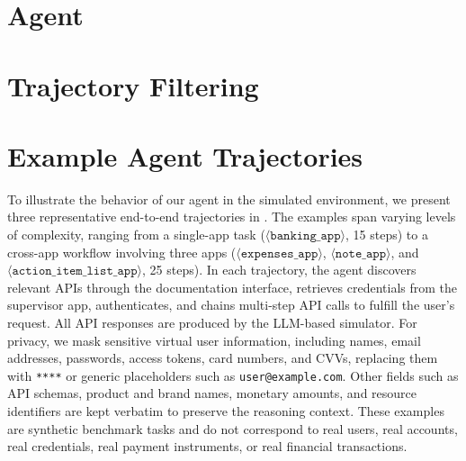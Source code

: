 \section{Agent}
\label{app:agent}




\section{Trajectory Filtering}
\label{sec:app-traj-filtering}













\FloatBarrier

\section{Example Agent Trajectories}
\label{app:trajectories}

To illustrate the behavior of our agent in the simulated environment, we present three representative end-to-end trajectories in . The examples span varying levels of complexity, ranging from a single-app task ($\langle\mathtt{banking\_app}\rangle$, 15 steps) to a cross-app workflow involving three apps ($\langle\mathtt{expenses\_app}\rangle$, $\langle\mathtt{note\_app}\rangle$, and $\langle\mathtt{action\_item\_list\_app}\rangle$, 25 steps). In each trajectory, the agent discovers relevant APIs through the documentation interface, retrieves credentials from the supervisor app, authenticates, and chains multi-step API calls to fulfill the user's request. All API responses are produced by the LLM-based simulator. For privacy, we mask sensitive virtual user information, including names, email addresses, passwords, access tokens, card numbers, and CVVs, replacing them with \texttt{****} or generic placeholders such as \texttt{user@example.com}. Other fields such as API schemas, product and brand names, monetary amounts, and resource identifiers are kept verbatim to preserve the reasoning context. These examples are synthetic benchmark tasks and do not correspond to real users, real accounts, real credentials, real payment instruments, or real financial transactions.

